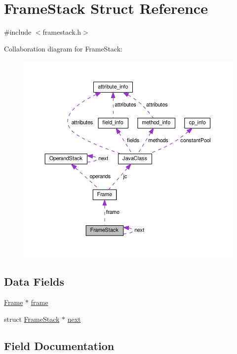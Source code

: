 \hypertarget{structFrameStack}{}\section{Frame\+Stack Struct Reference}
\label{structFrameStack}


{\ttfamily \#include $<$framestack.\+h$>$}



Collaboration diagram for Frame\+Stack\+:\nopagebreak
\begin{figure}[H]
\begin{center}
\leavevmode
\includegraphics[width=350pt]{structFrameStack__coll__graph}
\end{center}
\end{figure}
\subsection*{Data Fields}
\begin{DoxyCompactItemize}
\item 
\hyperlink{structFrame}{Frame} $\ast$ \hyperlink{structFrameStack_a6175986505277602d1e3cdc9fbbfb8b4}{frame}
\item 
struct \hyperlink{structFrameStack}{Frame\+Stack} $\ast$ \hyperlink{structFrameStack_a7b333d40fd3fda54503169413dec8ddd}{next}
\end{DoxyCompactItemize}


\subsection{Field Documentation}

